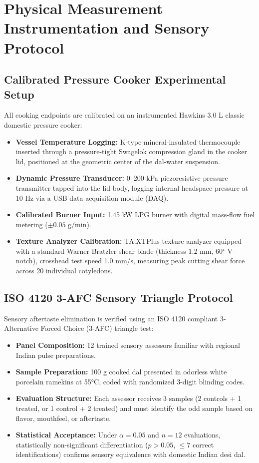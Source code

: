 \documentclass[10pt,a4paper]{article}
\begin{document}
\section{Physical Measurement Instrumentation and Sensory Protocol}

\subsection{Calibrated Pressure Cooker Experimental Setup}
All cooking endpoints are calibrated on an instrumented Hawkins 3.0 L classic domestic pressure cooker:
\begin{itemize}[leftmargin=*]
    \item \textbf{Vessel Temperature Logging:} K-type mineral-insulated thermocouple inserted through a pressure-tight Swagelok compression gland in the cooker lid, positioned at the geometric center of the dal-water suspension.
    \item \textbf{Dynamic Pressure Transducer:} 0--200 kPa piezoresistive pressure transmitter tapped into the lid body, logging internal headspace pressure at 10 Hz via a USB data acquisition module (DAQ).
    \item \textbf{Calibrated Burner Input:} 1.45 kW LPG burner with digital mass-flow fuel metering ($\pm 0.05\text{ g/min}$).
    \item \textbf{Texture Analyzer Calibration:} TA.XTPlus texture analyzer equipped with a standard Warner-Bratzler shear blade (thickness 1.2 mm, 60$^\circ$ V-notch), crosshead test speed 1.0 mm/s, measuring peak cutting shear force across 20 individual cotyledons.
\end{itemize}

\subsection{ISO 4120 3-AFC Sensory Triangle Protocol}
Sensory aftertaste elimination is verified using an ISO 4120 compliant 3-Alternative Forced Choice (3-AFC) triangle test:
\begin{itemize}[leftmargin=*]
    \item \textbf{Panel Composition:} 12 trained sensory assessors familiar with regional Indian pulse preparations.
    \item \textbf{Sample Preparation:} 100 g cooked dal presented in odorless white porcelain ramekins at 55\si{\celsius}, coded with randomized 3-digit blinding codes.
    \item \textbf{Evaluation Structure:} Each assessor receives 3 samples (2 controls + 1 treated, or 1 control + 2 treated) and must identify the odd sample based on flavor, mouthfeel, or aftertaste.
    \item \textbf{Statistical Acceptance:} Under $\alpha = 0.05$ and $n = 12$ evaluations, statistically non-significant differentiation ($p > 0.05$, $\le 7$ correct identifications) confirms sensory equivalence with domestic Indian desi dal.
\end{itemize}
\end{document}
